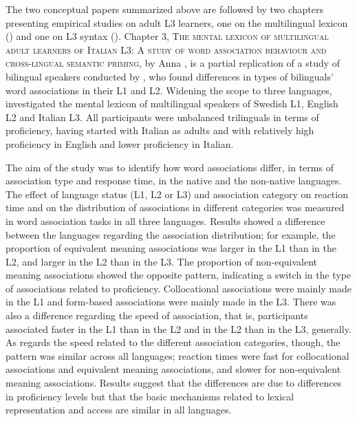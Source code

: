 \documentclass[output=paper,colorlinks,citecolor=brown,nonflat]{langsci/langscibook}
\begin{document}
The two conceptual papers summarized above are followed by two chapters presenting empirical studies on adult L3 learners, one on the multilingual lexicon (\citeauthor{chapters/gudmundson}) and one on L3 syntax (\citeauthor{chapters/sciutti}). Chapter 3, \textsc{The mental lexicon of multilingual adult learners of Italian L3: A study of word association behaviour and cross-lingual semantic priming}, by Anna \citeauthor{chapters/gudmundson}, is a partial replication of a study of bilingual speakers conducted by \citet{FitzpatrickIzura2011}, who found differences in types of bilinguals’ word associations in their L1 and L2. Widening the scope to three languages, \citeauthor{chapters/gudmundson} investigated the mental lexicon of multilingual speakers of Swedish L1, English L2 and Italian L3. All participants were unbalanced trilinguals in terms of proficiency, having started with Italian as adults and with relatively high proficiency in English and lower proficiency in Italian.

The aim of the study was to identify how word associations differ, in terms of association type and response time, in the native and the non-native languages. The effect of language status (L1, L2 or L3) and association category on reaction time and on the distribution of associations in different categories was measured in word association tasks in all three languages. Results showed a difference between the languages regarding the association distribution; for example, the proportion of equivalent meaning associations was larger in the L1 than in the L2, and larger in the L2 than in the L3. The proportion of non-equivalent meaning associations showed the opposite pattern, indicating a switch in the type of associations related to proficiency. Collocational associations were mainly made in the L1 and form-based associations were mainly made in the L3. There was also a difference regarding the speed of association, that is, participants associated faster in the L1 than in the L2 and in the L2 than in the L3, generally. As regards the speed related to the different association categories, though, the pattern was similar across all languages; reaction times were fast for collocational associations and equivalent meaning associations, and slower for non-equivalent meaning associations. Results suggest that the differences are due to differences in proficiency levels but that the basic mechanisms related to lexical representation and access are similar in all languages.
\end{document}
